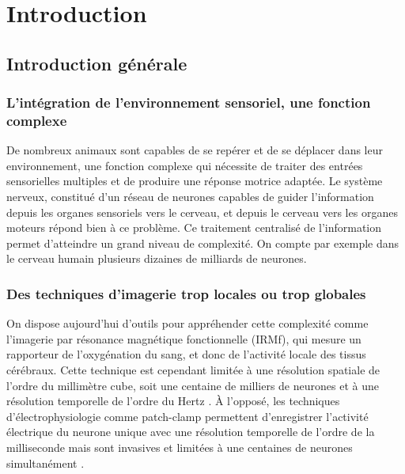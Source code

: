 \chapter{Introduction}\label{chapI}

\section{Introduction générale}

\subsection{L'intégration de l'environnement sensoriel, une fonction complexe}

De nombreux animaux sont capables de se repérer et de se déplacer dans leur environnement, une fonction complexe qui nécessite de traiter des entrées sensorielles multiples et de produire une réponse motrice adaptée. Le système nerveux, constitué d'un réseau de neurones capables de guider l'information depuis les organes sensoriels vers le cerveau, et depuis le cerveau vers les organes moteurs répond bien à ce problème. Ce traitement centralisé de l'information permet d'atteindre un grand niveau de complexité. On compte par exemple dans le cerveau humain plusieurs dizaines de milliards de neurones.

\subsection{Des techniques d'imagerie trop locales ou trop globales}

On dispose aujourd'hui d'outils pour appréhender cette complexité comme l'imagerie par résonance magnétique fonctionnelle (IRMf), qui mesure un rapporteur de l'oxygénation du sang, et donc de l'activité locale des tissus cérébraux. Cette technique est cependant limitée à une résolution spatiale de l'ordre du millimètre cube, soit une centaine de milliers de neurones et à une résolution temporelle de l'ordre du Hertz \cite{goense_fmri_2016}. À l'opposé, les techniques d'électrophysiologie comme patch-clamp permettent d'enregistrer l'activité électrique du neurone unique avec une résolution temporelle de l'ordre de la milliseconde mais sont invasives et limitées à une centaines de neurones simultanément \cite{berdondini_active_2009}.

